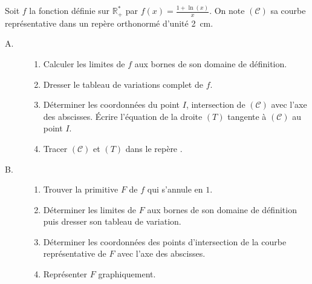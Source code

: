 \begin{exo}
\label{exo:pb un plus ln}
Soit $f$ la fonction d\'efinie sur $\mathbb{R}^*_+$ par $f(x) = \frac{1 + \ln (x)}{x}$.
On note $(\mathscr{C})$ sa courbe repr\'esentative dans un rep\`ere orthonorm\'e
\Oij{} d'unit\'e 2~cm.
\begin{description}
\item[A.] \begin{enumerate}
      \item Calculer les limites de $f$ aux bornes de son domaine de d\'efinition.
      \item Dresser le tableau de variations complet de $f$.
      \item D\'eterminer les coordonn\'ees du point $I$, intersection de $(\mathscr{C})$ avec l'axe des abscisses.
            \'Ecrire l'\'equation de la droite $(T)$ tangente \`a $(\mathscr{C})$ au point $I$.
      \item Tracer $(\mathscr{C})$ et $(T)$ dans le rep\`ere \Oij.
      \end{enumerate}
\item[B.] \begin{enumerate}
      \item Trouver la primitive $F$ de $f$ qui s'annule en $1$.
      \item D\'eterminer les limites de $F$ aux bornes de son domaine de d\'efinition puis dresser son tableau de variation.
      \item D\'eterminer les coordonn\'ees des points d'intersection de la courbe repr\'esentative de $F$ avec l'axe des abscisses.
      \item Repr\'esenter $F$ graphiquement.
      \end{enumerate}
\end{description}
\end{exo}
